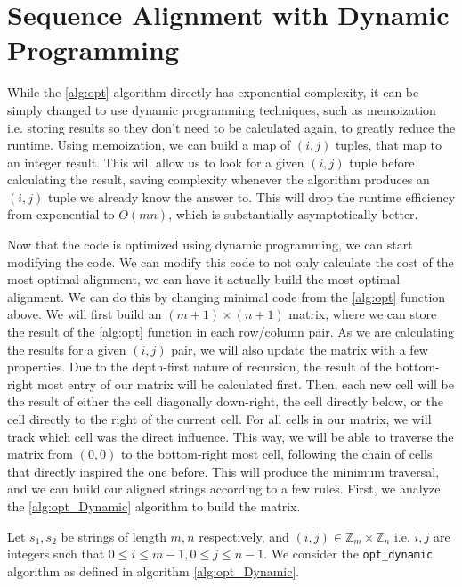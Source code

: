 \documentclass{article}
\renewcommand{\_}{\ifincsname_\else\legacyunderscore\fi}
\begin{document}
    \section*{Sequence Alignment with Dynamic Programming}

        While the \ref{alg:opt} algorithm directly has exponential complexity, it can be simply changed to use dynamic programming techniques, such as memoization i.e. storing results so they don't need to be calculated again, to greatly reduce the runtime. Using memoization, we can build a map of $(i, j)$ tuples, that map to an integer result. This will allow us to look for a given $(i, j)$ tuple before calculating the result, saving complexity whenever the algorithm produces an $(i, j)$ tuple we already know the answer to. This will drop the runtime efficiency from exponential to $O(mn)$, which is substantially asymptotically better. 

	Now that the code is optimized using dynamic programming, we can start modifying the code. We can modify this code to not only calculate the cost of the most optimal alignment, we can have it actually build the most optimal alignment. We can do this by changing minimal code from the \ref{alg:opt} function above. We will first build an $(m+1)\times (n+1)$ matrix, where we can store the result of the \ref{alg:opt} function in each row/column pair. As we are calculating the results for a given $(i, j)$ pair, we will also update the matrix with a few properties. Due to the depth-first nature of recursion, the result of the bottom-right most entry of our matrix will be calculated first. Then, each new cell will be the result of either the cell diagonally down-right, the cell directly below, or the cell directly to the right of the current cell. For all cells in our matrix, we will track which cell was the direct influence. This way, we will be able to traverse the matrix from $(0, 0)$ to the bottom-right most cell, following the chain of cells that directly inspired the one before. This will produce the minimum traversal, and we can build our aligned strings according to a few rules. First, we analyze the \ref{alg:opt_Dynamic} algorithm to build the matrix. 

        Let $s_1, s_2$ be strings of length $m, n$ respectively, and $(i, j) \in \mathbb{Z}_m \times \mathbb{Z}_n$ i.e. $i, j$ are integers such that $0 \leq i \leq m - 1, 0 \leq j \leq n - 1$.  We consider the \texttt{opt\_dynamic} algorithm as defined in algorithm \ref{alg:opt_Dynamic}.
\end{document}
